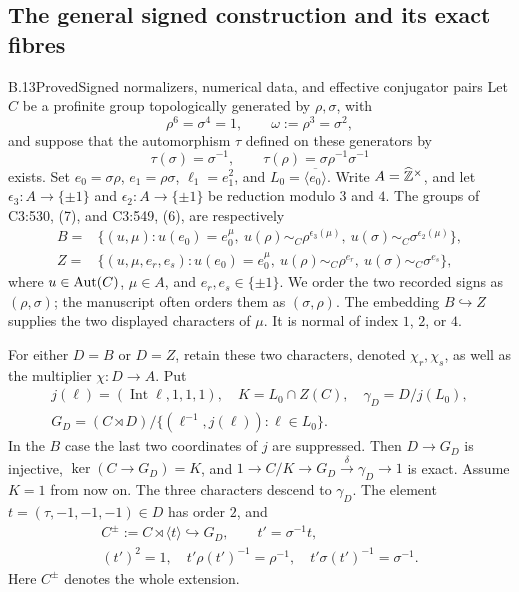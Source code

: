 \subsection{The general signed construction and its exact fibres}

\begin{statement}{B.13}{Proved}{Signed normalizers, numerical data, and effective conjugator pairs}
Let $C$ be a profinite group topologically generated by $\rho,\sigma$,
with
\[
 \rho^6=\sigma^4=1,\qquad \omega:=\rho^3=\sigma^2,
\]
and suppose that the automorphism $\tau$ defined on these generators by
\[
 \tau(\sigma)=\sigma^{-1},\qquad
 \tau(\rho)=\sigma\rho^{-1}\sigma^{-1}
                                                        \tag{B.13.1}
\]
exists. Set $e_0=\sigma\rho$, $e_1=\rho\sigma$,
$\ell_1=e_1^2$, and $L_0=\overline{\langle e_0\rangle}$.
Write $A=\widehat{\mathbb Z}^\times$, and let $\epsilon_3:A\to\{\pm1\}$
and $\epsilon_2:A\to\{\pm1\}$ be reduction modulo $3$ and $4$.
The groups of C3:530, (7), and C3:549, (6), are respectively
\[
\begin{aligned}
 B={}&\{(u,\mu): u(e_0)=e_0^\mu,
       \ u(\rho)\sim_C\rho^{\epsilon_3(\mu)},
       \ u(\sigma)\sim_C\sigma^{\epsilon_2(\mu)}\},\\
 Z={}&\{(u,\mu,e_r,e_s):u(e_0)=e_0^\mu,
       \ u(\rho)\sim_C\rho^{e_r},
       \ u(\sigma)\sim_C\sigma^{e_s}\},
\end{aligned}
\tag{B.13.2}
\]
where $u\in\operatorname{Aut}(C)$, $\mu\in A$, and $e_r,e_s\in\{\pm1\}$.
We order the two recorded signs as $(\rho,\sigma)$; the manuscript
often orders them as $(\sigma,\rho)$.
The embedding $B\hookrightarrow Z$ supplies the two displayed
characters of $\mu$. It is normal of index $1$, $2$, or $4$.

For either $D=B$ or $D=Z$, retain these two characters, denoted
$\chi_r,\chi_s$, as well as the multiplier $\chi:D\to A$.
Put
\[
\begin{gathered}
 j(\ell)=(\operatorname{Int}\ell,1,1,1),\quad
 K=L_0\cap Z(C),\quad \gamma_D=D/j(L_0),\\
 G_D=(C\rtimes D)/\{(\ell^{-1},j(\ell)):\ell\in L_0\}.
\end{gathered}
\tag{B.13.3}
\]
In the $B$ case the last two coordinates of $j$ are suppressed.
Then $D\to G_D$ is injective, $\ker(C\to G_D)=K$, and
$1\to C/K\to G_D\xrightarrow{\delta}\gamma_D\to1$ is exact.
Assume $K=1$ from now on. The three characters descend to $\gamma_D$.
The element $t=(\tau,-1,-1,-1)\in D$ has order $2$, and
\[
\begin{gathered}
 C^{\pm}:=C\rtimes\langle t\rangle\hookrightarrow G_D,
 \qquad t'=\sigma^{-1}t,\\
 (t')^2=1,\quad t'\rho(t')^{-1}=\rho^{-1},\quad
 t'\sigma(t')^{-1}=\sigma^{-1}.
\end{gathered}
\tag{B.13.4}
\]
Here $C^{\pm}$ denotes the whole extension.


\end{statement}

